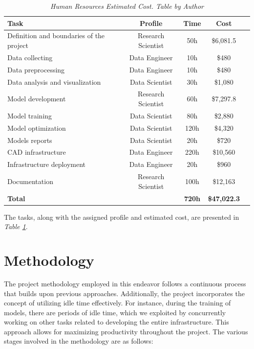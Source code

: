 \newpage

\begin{table}[H]
\centering
\begin{tabular}{lcccc}
	 \toprule
\textbf{Task} & \textbf{Profile} & \textbf{Time} & \textbf{Cost} \\
		\midrule
    Definition and boundaries of the project & Research Scientist & 50h & \$6,081.5\\
    Data collecting & Data Engineer & 10h & \$480\\
    Data preprocessing & Data Engineer & 10h & \$480 \\
    Data analysis and visualization & Data Scientist & 30h & \$1,080\\
    Model development & Research Scientist & 60h & \$7,297.8 \\
    Model training & Data Scientist & 80h & \$2,880 \\
    Model optimization & Data Scientist & 120h & \$4,320 \\
    Models reports & Data Scientist & 20h & \$720 \\
    CAD infrastructure & Data Engineer & 220h & \$10,560 \\
    Infrastructure deployment & Data Engineer & 20h & \$960 \\
    Documentation & Research Scientist & 100h & \$12,163 \\
		\midrule
    \textbf{Total} &    &  \textbf{720h} & \textbf{\$47,022.3} \\
    \bottomrule
\end{tabular}
\caption[Human Resources Estimated Cost.]
  {\textit{Human Resources Estimated Cost. Table by Author}}
{\label{table:human_resources_cost}}
\end{table}

The tasks, along with the assigned profile and estimated cost, are presented in \textit{Table \ref{table:human_resources_cost}}. \\

\section{Methodology}

The project methodology employed in this endeavor
follows a continuous process that builds upon previous approaches.
Additionally, the project incorporates the concept of utilizing idle time effectively.
For instance, during the training of models, there are periods of idle time, which we exploited by
concurrently working on other tasks related to developing the entire infrastructure.
This approach allows for maximizing productivity throughout the project.
The various stages involved in the methodology are as follows: \\


